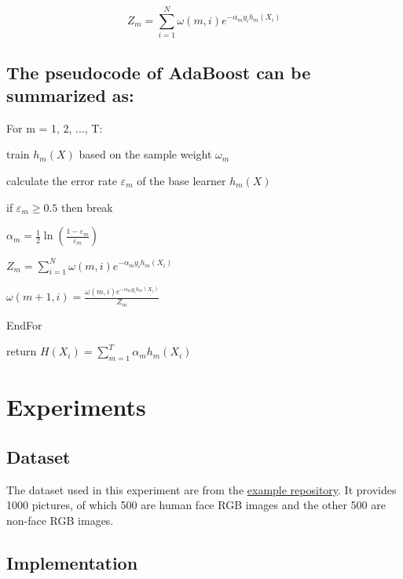 \documentclass[journal, a4paper, onecolumn]{IEEEtran}
\begin{document}
\begin{multicols}{2}
\begin{equation}
Z_{m}=\sum_{i=1}^{N}{\omega\left(m,i\right)e^{-\alpha_my_ih_m\left(X_i\right)}}
\end{equation}

    \subsection*{The pseudocode of AdaBoost can be summarized as: }

\begin{framed}

\noindent For m = 1, 2, ..., T: 

    train $h_m\left(X\right)$ based on the sample weight $\omega_m$

    calculate the error rate $\varepsilon_m$ of the base learner $h_m\left(X\right)$

    if $\varepsilon_m\ge0.5$ then break 

$\alpha_m=\frac{1}{2}\ln\left(\frac{1-\varepsilon_m}{\varepsilon_m}\right)$ 

$Z_{m}=\sum_{i=1}^{N}{\omega\left(m,i\right)e^{-\alpha_my_ih_m\left(X_i\right)}}$

$\omega\left(m+1,i\right)=\frac{\omega\left(m,i\right)e^{-\alpha_my_ih_m\left(X_i\right)}}{Z_{m}}$

\noindent EndFor

\noindent return $H\left(X_i\right)=\sum_{m=1}^{T}{\alpha_mh_m\left(X_i\right)}$

\end{framed}

\section{Experiments}
\subsection{Dataset}
The dataset used in this experiment are from the \href{https://github.com/wujiaju/ML2018-lab-03}{example repository}. It provides 1000 pictures, of which 500 are human face RGB images and the other 500 are non-face RGB images. 

\subsection{Implementation}

\end{multicols}
\end{document}

